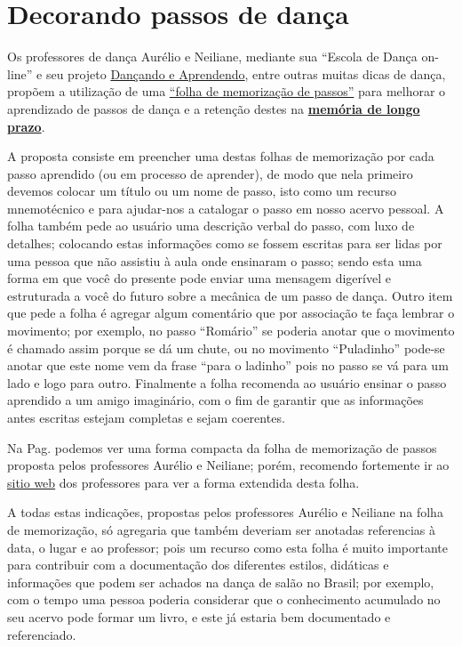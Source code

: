 
\section{Decorando passos de dança}
\label{sec:decorando-passos-de-danca}
Os professores de dança Aurélio e Neiliane,
mediante sua ``Escola de Dança on-line'' e seu projeto 
\href{https://www.facebook.com/dancandoeaprendendo/}{Dançando e Aprendendo}, 
entre outras muitas dicas de dança,
propõem
a utilização de uma \href{https://www.youtube.com/watch?v=ePwjQx5egAo}{``folha de memorização de passos''} 
para melhorar o aprendizado de passos de dança 
e a retenção destes na \hyperref[sec:memoria:longo]{\textbf{memória de longo prazo}}.

A proposta consiste em preencher uma destas folhas de memorização
por cada passo aprendido (ou em processo de aprender),
de modo que nela primeiro devemos colocar um título ou um nome de passo,
isto como um recurso mnemotécnico e para ajudar-nos a catalogar o passo em nosso acervo pessoal.
A folha também pede ao usuário uma descrição verbal do passo, com luxo de detalhes;
colocando estas informações como se fossem escritas para ser lidas por uma pessoa 
que não assistiu à aula onde ensinaram o passo; 
sendo esta uma forma em que você do presente pode enviar 
uma mensagem digerível e estruturada a você do futuro
sobre a mecânica de um passo de dança.
Outro item que pede a folha é agregar algum comentário que por associação 
te faça lembrar o movimento; por exemplo, no passo ``Romário'' se poderia anotar que 
o movimento é chamado assim porque se dá um chute, ou 
no movimento ``Puladinho'' pode-se anotar que este nome vem da frase ``para o ladinho'' pois no passo 
se vá para um lado e logo para outro.
Finalmente a folha recomenda ao usuário
ensinar o passo aprendido a um amigo imaginário,
com o fim de garantir que as informações antes escritas estejam completas 
e sejam coerentes.

\begin{tcbattention}
Na Pag. \pageref{pos:page:folhamemorizacao} 
podemos ver uma forma compacta da folha de memorização 
de passos proposta pelos professores Aurélio e Neiliane; porém,
recomendo fortemente ir ao 
\href{https://www.youtube.com/watch?v=ePwjQx5egAo}{sitio web}
dos professores para ver a forma extendida desta folha.
\end{tcbattention}

A todas estas indicações, 
propostas pelos professores Aurélio e Neiliane
na folha de memorização,
só agregaria que também deveriam ser anotadas referencias 
à data, o lugar e ao professor; pois um recurso como esta folha é muito importante
para contribuir com a documentação dos diferentes estilos, didáticas e informações
que podem ser achados na dança de salão no Brasil;
por exemplo, com o tempo uma pessoa poderia considerar que o conhecimento 
acumulado no seu acervo pode formar um livro, 
e este já estaria bem documentado e referenciado.

